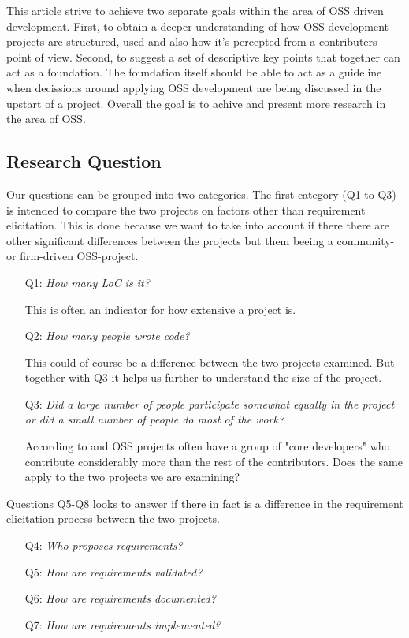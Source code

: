 \documentclass[a4paper,11pt]{article}
\begin{document}
{%

This article strive to achieve two separate goals within the area of OSS driven development. First, to obtain a deeper understanding of how OSS development projects are structured, used and also how it's percepted from a contributers point of view. Second, to suggest a set of descriptive key points that together can act as a foundation. The foundation itself should be able to act as a guideline when decissions around applying OSS development are being discussed in the upstart of a project. Overall the goal is to achive and present more research in the area of OSS.


\subsection{Research Question}
Our questions can be grouped into two categories. The first category (Q1 to Q3) is intended to compare the two projects on factors other than requirement elicitation. This is done because we want to take into account if there there are other significant differences between the projects but them beeing a community- or firm-driven OSS-project.
\begin{itemize}
	\item[Q1:]\emph{How many LoC is it?}
	
	This is often an indicator for how extensive a project is.
	\item[Q2:]\emph{How many people wrote code?}
	
	This could of course be a difference between the two projects examined. But together with Q3 it helps us further to understand the size of the project.
	\item[Q3:]\emph{Did a large number of people participate somewhat equally in the project or did a small number of people do most of the work?}
	
	According to \cite{Noll} and \cite{Mockus2002a} OSS projects often have a group of "core developers" who contribute considerably more than the rest of the contributors. Does the same apply to the two projects we are examining?
\end{itemize}
Questions Q5-Q8 looks to answer if there in fact is a difference in the requirement elicitation process between the two projects.
\begin{itemize}
	\item[Q4:]\emph{Who proposes requirements?}
	\item[Q5:]\emph{How are requirements validated?}
	\item[Q6:]\emph{How are requirements documented?}
	\item[Q7:]\emph{How are requirements implemented?}
\end{itemize}

}
\end{document}
